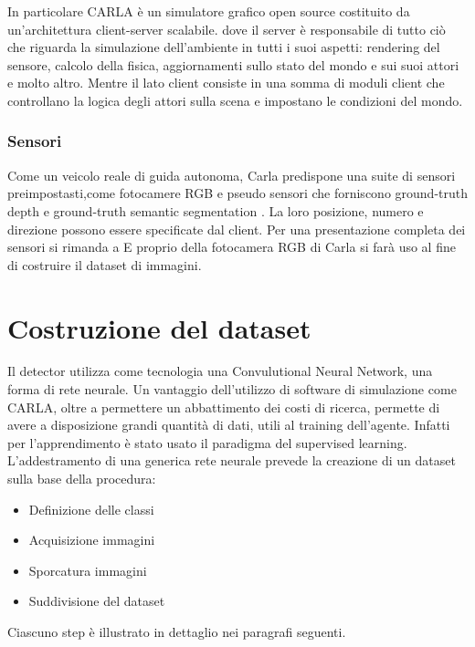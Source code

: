 \documentclass[14pt]{extarticle}
\begin{document}
In particolare CARLA è un simulatore grafico open source costituito da un'architettura client-server scalabile.
dove il server è responsabile  di tutto ciò che riguarda la simulazione dell'ambiente in tutti i suoi aspetti: rendering del sensore, calcolo della fisica, aggiornamenti sullo stato del mondo e sui suoi attori e molto altro. 
Mentre il lato client consiste in una somma di moduli client che controllano la logica degli attori sulla scena e impostano le condizioni del mondo. 
\subsubsection{Sensori}
Come un veicolo reale di guida autonoma, Carla predispone una suite di sensori preimpostasti,come fotocamere RGB e pseudo sensori che forniscono ground-truth depth e ground-truth semantic segmentation .
La loro posizione, numero e direzione possono essere specificate dal client.
Per una presentazione completa dei sensori si rimanda a \cite{tesi niccolo galli}
E proprio della fotocamera RGB di Carla si farà uso al fine di costruire il dataset di immagini.

\section{Costruzione del dataset}
Il detector utilizza come tecnologia una Convulutional Neural Network, una forma di rete neurale. 
Un vantaggio dell'utilizzo di software di simulazione come CARLA, oltre a permettere un abbattimento dei costi di ricerca, permette di avere a disposizione grandi quantità di dati, utili al training dell'agente.
Infatti per l'apprendimento è stato usato il paradigma del supervised learning.
L'addestramento di una generica rete neurale prevede la creazione di un dataset sulla
base della procedura:
\begin{itemize}
\item Definizione delle classi
\item Acquisizione immagini
\item Sporcatura immagini
\item Suddivisione del dataset
\end{itemize}

Ciascuno step è illustrato in dettaglio nei paragrafi seguenti.
\end{document}
